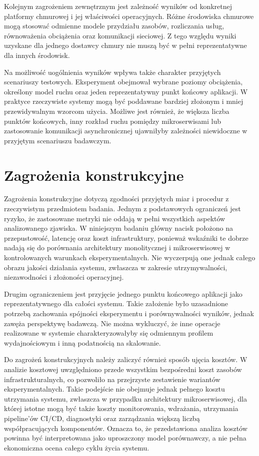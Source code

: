 Kolejnym zagrożeniem zewnętrznym jest zależność wyników od konkretnej platformy chmurowej i jej właściwości operacyjnych. Różne środowiska chmurowe mogą stosować odmienne modele przydziału zasobów, rozliczania usług, równoważenia obciążenia oraz komunikacji sieciowej. Z tego względu wyniki uzyskane dla jednego dostawcy chmury nie muszą być w pełni reprezentatywne dla innych środowisk.

Na możliwość uogólnienia wyników wpływa także charakter przyjętych scenariuszy testowych. Eksperyment obejmował wybrane poziomy obciążenia, określony model ruchu oraz jeden reprezentatywny punkt końcowy aplikacji. W praktyce rzeczywiste systemy mogą być poddawane bardziej złożonym i mniej przewidywalnym wzorcom użycia. Możliwe jest również, że większa liczba punktów końcowych, inny rozkład ruchu pomiędzy mikroserwisami lub zastosowanie komunikacji asynchronicznej ujawniłyby zależności niewidoczne w przyjętym scenariuszu badawczym.

\section{Zagrożenia konstrukcyjne}

Zagrożenia konstrukcyjne dotyczą zgodności przyjętych miar i procedur z rzeczywistym przedmiotem badania. Jednym z podstawowych ograniczeń jest ryzyko, że zastosowane metryki nie oddają w pełni wszystkich aspektów analizowanego zjawiska. W niniejszym badaniu główny nacisk położono na przepustowość, latencję oraz koszt infrastruktury, ponieważ wskaźniki te dobrze nadają się do porównania architektury monolitycznej i mikroserwisowej w kontrolowanych warunkach eksperymentalnych. Nie wyczerpują one jednak całego obrazu jakości działania systemu, zwłaszcza w zakresie utrzymywalności, niezawodności i złożoności operacyjnej.

Drugim ograniczeniem jest przyjęcie jednego punktu końcowego aplikacji jako reprezentatywnego dla całości systemu. Takie założenie było uzasadnione potrzebą zachowania spójności eksperymentu i porównywalności wyników, jednak zawęża perspektywę badawczą. Nie można wykluczyć, że inne operacje realizowane w systemie charakteryzowałyby się odmiennym profilem wydajnościowym i inną podatnością na skalowanie.

Do zagrożeń konstrukcyjnych należy zaliczyć również sposób ujęcia kosztów. W analizie kosztowej uwzględniono przede wszystkim bezpośredni koszt zasobów infrastrukturalnych, co pozwoliło na przejrzyste zestawienie wariantów eksperymentalnych. Takie podejście nie obejmuje jednak pełnego kosztu utrzymania systemu, zwłaszcza w przypadku architektury mikroserwisowej, dla której istotne mogą być także koszty monitorowania, wdrażania, utrzymania pipeline'ów CI/CD, diagnostyki oraz zarządzania większą liczbą współpracujących komponentów. Oznacza to, że przedstawiona analiza kosztów powinna być interpretowana jako uproszczony model porównawczy, a nie pełna ekonomiczna ocena całego cyklu życia systemu.